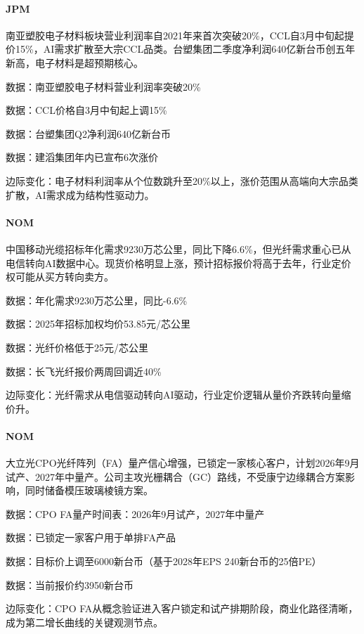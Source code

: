 \documentclass[11pt]{ctexart}
\begin{document}
\paragraph{JPM} 南亚塑胶电子材料板块营业利润率自2021年来首次突破20\%，CCL自3月中旬起提价15\%，AI需求扩散至大宗CCL品类。台塑集团二季度净利润640亿新台币创五年新高，电子材料是超预期核心。
{\small\color{refgray}数据：南亚塑胶电子材料营业利润率突破20\%\par}
{\small\color{refgray}数据：CCL价格自3月中旬起上调15\%\par}
{\small\color{refgray}数据：台塑集团Q2净利润640亿新台币\par}
{\small\color{refgray}数据：建滔集团年内已宣布6次涨价\par}
{\small\color{refgray}边际变化：电子材料利润率从个位数跳升至20\%以上，涨价范围从高端向大宗品类扩散，AI需求成为结构性驱动力。\par}
\paragraph{NOM} 中国移动光缆招标年化需求9230万芯公里，同比下降6.6\%，但光纤需求重心已从电信转向AI数据中心。现货价格明显上涨，预计招标报价将高于去年，行业定价权可能从买方转向卖方。
{\small\color{refgray}数据：年化需求9230万芯公里，同比-6.6\%\par}
{\small\color{refgray}数据：2025年招标加权均价53.85元/芯公里\par}
{\small\color{refgray}数据：光纤价格低于25元/芯公里\par}
{\small\color{refgray}数据：长飞光纤报价两周回调近40\%\par}
{\small\color{refgray}边际变化：光纤需求从电信驱动转向AI驱动，行业定价逻辑从量价齐跌转向量缩价升。\par}
\paragraph{NOM} 大立光CPO光纤阵列（FA）量产信心增强，已锁定一家核心客户，计划2026年9月试产、2027年中量产。公司主攻光栅耦合（GC）路线，不受康宁边缘耦合方案影响，同时储备模压玻璃棱镜方案。
{\small\color{refgray}数据：CPO FA量产时间表：2026年9月试产，2027年中量产\par}
{\small\color{refgray}数据：已锁定一家客户用于单排FA产品\par}
{\small\color{refgray}数据：目标价上调至6000新台币（基于2028年EPS 240新台币的25倍PE）\par}
{\small\color{refgray}数据：当前报价约3950新台币\par}
{\small\color{refgray}边际变化：CPO FA从概念验证进入客户锁定和试产排期阶段，商业化路径清晰，成为第二增长曲线的关键观测节点。\par}
\end{document}
